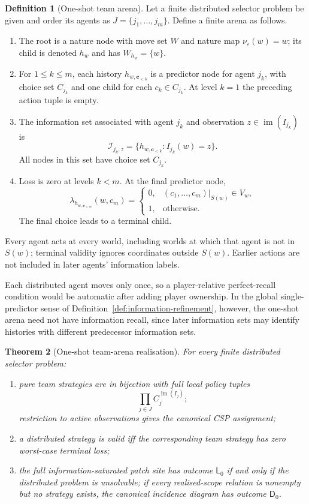 \documentclass[11pt]{article}
\theoremstyle{plain}
\newtheorem{theorem}{Theorem}[section]
\theoremstyle{definition}
\newtheorem{definition}[theorem]{Definition}
\theoremstyle{remark}
\newcommand{\im}{\operatorname{im}}
\begin{document}
\begin{definition}[One-shot team arena]\label{def:oneshot}
Let a finite distributed selector problem be given and order its agents as
$J=\{j_1,\ldots,j_m\}$. Define a finite arena as follows.
\begin{enumerate}[label=(\roman*)]
\item The root is a nature node with move set $W$ and nature map
$\nu_\varepsilon(w)=w$; its child is denoted $h_w$ and has
$W_{h_w}=\{w\}$.
\item For $1\le k\le m$, each history
$h_{w,\mathbf c_{<k}}$ is a predictor node for agent $j_k$, with choice set
$C_{j_k}$ and one child for each $c_k\in C_{j_k}$. At level $k=1$ the preceding
action tuple is empty.
\item The information set associated with agent $j_k$ and observation
$z\in\im(I_{j_k})$ is
\[
\mathcal I_{j_k,z}
=\{h_{w,\mathbf c_{<k}}:I_{j_k}(w)=z\}.
\]
All nodes in this set have choice set $C_{j_k}$.
\item Loss is zero at levels $k<m$. At the final predictor node,
\[
\lambda_{h_{w,\mathbf c_{<m}}}(w,c_m)=
\begin{cases}
0,&(c_1,\ldots,c_m)|_{S(w)}\in V_w,\\
1,&\text{otherwise}.
\end{cases}
\]
The final choice leads to a terminal child.
\end{enumerate}
Every agent acts at every world, including worlds at which that agent is not in
$S(w)$; terminal validity ignores coordinates outside $S(w)$. Earlier actions
are not included in later agents' information labels.
\end{definition}

Each distributed agent moves only once, so a player-relative perfect-recall
condition would be automatic after adding player ownership. In the global
single-predictor sense of Definition~\ref{def:information-refinement}, however,
the one-shot arena need not have information recall, since later information
sets may identify histories with different predecessor information sets.

\begin{theorem}[One-shot team-arena realisation]\label{thm:oneshot}
For every finite distributed selector problem:
\begin{enumerate}[label=(\roman*)]
\item pure team strategies are in bijection with full local policy tuples
\[
\prod_{j\in J}C_j^{\im(I_j)};
\]
restriction to active observations gives the canonical CSP assignment;
\item a distributed strategy is valid iff the corresponding team strategy has
zero worst-case terminal loss;
\item the full information-saturated patch site has outcome $\mathsf L_0$ if
and only if the distributed problem is unsolvable; if every realised-scope
relation is nonempty but no strategy exists, the canonical incidence diagram
has outcome $\mathsf D_0$.
\end{enumerate}
\end{theorem}
\end{document}
